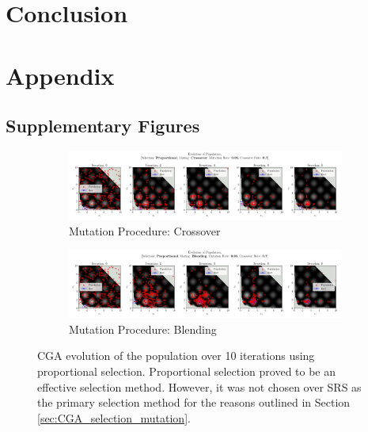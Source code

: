 \documentclass[10pt]{article}
\begin{document}
\section{Conclusion}

\newpage
\section{Appendix}
\subsection{Supplementary Figures}
\begin{figure}[H]
    \centering
    \begin{subfigure}{0.85\textwidth}
        \centering
        \includegraphics[width=\textwidth]{../figures/KBF/10_iters/Proportional/Crossover/0.05_0.7_Population.png}
        \caption{Mutation Procedure: Crossover}
        \label{fig:CGA_flowchart_proportional_crossover}
    \end{subfigure}
    \begin{subfigure}{0.85\textwidth}
        \centering
        \includegraphics[width=\textwidth]{../figures/KBF/10_iters/Proportional/Blending/0.05_0.7_Population.png}
        \caption{Mutation Procedure: Blending}
        \label{fig:CGA_flowchart_proportional_blending}
    \end{subfigure}
    \captionsetup{justification=centering}
    \caption{CGA evolution of the population over 10 iterations using proportional selection. Proportional selection proved to be an effective selection method. However, it was not chosen over SRS as the primary selection method for the reasons outlined in Section \ref{sec:CGA_selection_mutation}.}
    \label{fig:CGA_flowchart_proportional}
\end{figure}
\end{document}
